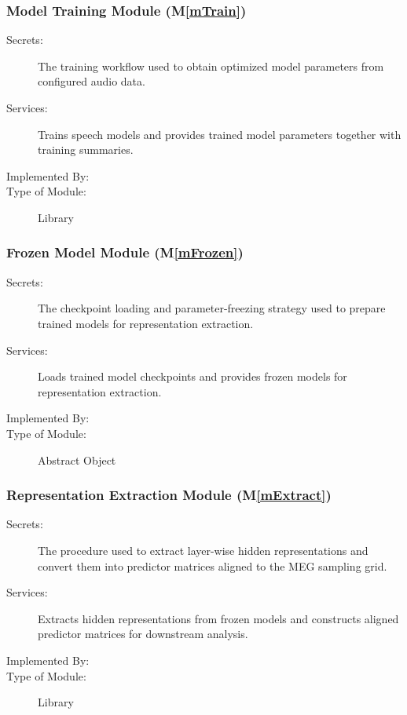 \documentclass[12pt, titlepage]{article}
\newcommand{\mref}[1]{M\ref{#1}}
\begin{document}
\subsubsection{Model Training Module (\mref{mTrain})}

\begin{description}
\item[Secrets:] The training workflow used to obtain optimized model
parameters from configured audio data.
\item[Services:] Trains speech models and provides trained model parameters
together with training summaries.
\item[Implemented By:] \progname{}
\item[Type of Module:] Library
\end{description}




\subsubsection{Frozen Model Module (\mref{mFrozen})}

\begin{description}
\item[Secrets:] The checkpoint loading and parameter-freezing strategy used to prepare trained models for representation extraction.
\item[Services:] Loads trained model checkpoints and provides frozen models for representation extraction.
\item[Implemented By:] \progname{}
\item[Type of Module:] Abstract Object
\end{description}




\subsubsection{Representation Extraction Module (\mref{mExtract})}

\begin{description}
\item[Secrets:] The procedure used to extract layer-wise hidden representations and convert them into predictor matrices aligned to the MEG sampling grid.
\item[Services:] Extracts hidden representations from frozen models and
constructs aligned predictor matrices for downstream analysis.
\item[Implemented By:] \progname{}
\item[Type of Module:] Library
\end{description}
\end{document}
